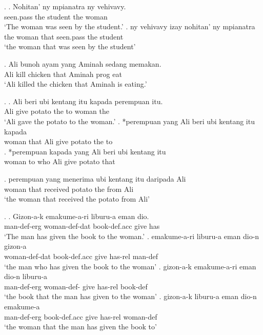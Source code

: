 \ex.
\ag. Nohitan' ny mpianatra ny vehivavy.\\
 seen.\ac{pass} the student the woman\\
 `The woman was seen by the student.'
\bg. ny vehivavy izay nohitan' ny mpianatra\\
 the woman that seen.\ac{pass} the student\\
 `the woman that was seen by the student' 





\exg. Ali bunoh ayam yang Aminah sedang memakan.\\
 Ali kill chicken that Aminah \ac{prog} eat\\
 `Ali killed the chicken that Aminah is eating.' 

\ex.
\ag. Ali beri {ubi kentang} itu kapada perempuan itu.\\
 Ali give potato the to woman the\\
 `Ali gave the potato to the woman.'
\bg. *perempuan yang Ali beri {ubi kentang} itu kapada\\
 woman that Ali give potato the to\\
\bg. *perempuan kapada yang Ali beri {ubi kentang} itu\\
 woman to who Ali give potato that\\ 

\exg. perempuan yang menerima {ubi kentang} itu daripada Ali\\
 woman that received potato the from Ali\\
 `the woman that received the potato from Ali'




\ex.
\ag. Gizon-a-k emakume-a-ri liburu-a eman dio.\\
 man-\ac{def}-\ac{erg} woman-\ac{def}-\ac{dat} book-\ac{def}.\ac{acc} give has\\
 `The man has given the book to the woman.'
\bg. emakume-a-ri liburu-a eman dio-n gizon-a\\
 woman-\ac{def}-\ac{dat} book-\ac{def}.\ac{acc} give has-\ac{rel} man-\ac{def}\\
 `the man who has given the book to the woman'
\bg. gizon-a-k emakume-a-ri eman dio-n liburu-a\\
 man-\ac{def}-\ac{erg} woman-\ac{def}- give has-\ac{rel} book-\ac{def}\\
 `the book that the man has given to the woman'
\bg. gizon-a-k liburu-a eman dio-n emakume-a\\
 man-\ac{def}-\ac{erg} book-\ac{def}.\ac{acc} give has-\ac{rel} woman-\ac{def}\\
 `the woman that the man has given the book to' 




